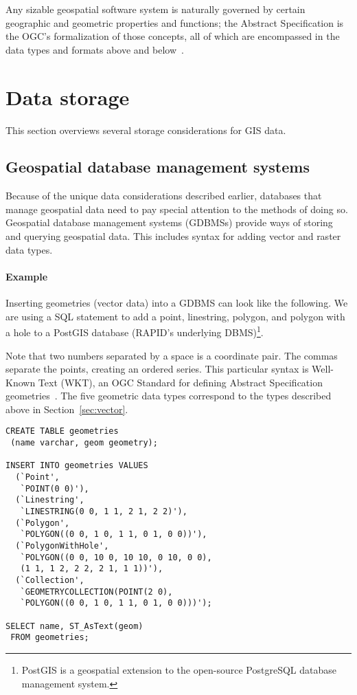 Any sizable geospatial software system is naturally governed by certain geographic and geometric properties and functions; the Abstract Specification is the OGC's formalization of those concepts, all of which are encompassed in the data types and formats above and below~\cite{AbstractSpecFaq}.

\section{Data storage}
This section overviews several storage considerations for GIS data.

\subsection{Geospatial database management systems}
Because of the unique data considerations described earlier, databases that manage geospatial data need to pay special attention to the methods of doing so. Geospatial database management systems (GDBMSs) provide ways of storing and querying geospatial data. This includes syntax for adding vector and raster data types.

\paragraph{Example}
Inserting geometries (vector data) into a GDBMS can look like the following. We are using a SQL statement to add a point, linestring, polygon, and polygon with a hole to a PostGIS database (RAPID's underlying DBMS)\footnote{PostGIS is a geospatial extension to the open-source PostgreSQL database management system.}.

Note that two numbers separated by a space is a coordinate pair. The commas separate the points, creating an ordered series. This particular syntax is Well-Known Text (WKT), an OGC Standard for defining Abstract Specification geometries~\cite{ogc}. The five geometric data types correspond to the types described above in Section~\ref{sec:vector}.

\begin{verbatim}
CREATE TABLE geometries
 (name varchar, geom geometry);

INSERT INTO geometries VALUES
  (`Point',
   `POINT(0 0)'),
  (`Linestring',
   `LINESTRING(0 0, 1 1, 2 1, 2 2)'),
  (`Polygon',
   `POLYGON((0 0, 1 0, 1 1, 0 1, 0 0))'),
  (`PolygonWithHole',
   `POLYGON((0 0, 10 0, 10 10, 0 10, 0 0),
   (1 1, 1 2, 2 2, 2 1, 1 1))'),
  (`Collection',
   `GEOMETRYCOLLECTION(POINT(2 0),
   `POLYGON((0 0, 1 0, 1 1, 0 1, 0 0)))');

SELECT name, ST_AsText(geom)
 FROM geometries;
\end{verbatim}

